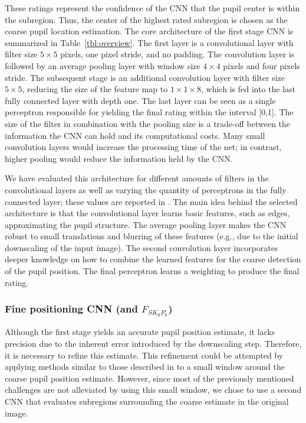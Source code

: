 These ratings represent the confidence of the CNN that the pupil center is
within the subregion. Thus, the center of the highest rated subregion is chosen
as the coarse pupil location estimation.
The core architecture of the first stage CNN is summarized in Table~\ref{tbl:overview}.
The first layer is a convolutional layer with filter size $5\times5$ pixels, one
pixel stride, and no padding.
The convolution layer is followed by an average pooling layer with window size
$4\times4$ pixels and four pixels stride. The subsequent stage is an additional
convolution layer with filter size $5\times5$, reducing the size of the feature
map to $1\times1\times8$, which is fed into the last fully connected layer with
depth one.
The last layer can be seen as a single perceptron responsible for yielding
the final rating within the interval [0,1]. The size of the filter in combination
with the pooling size is a trade-off between the information the CNN can hold
and its computational costs. Many small convolution layers would increase the
processing time of the net; in contrast, higher pooling would reduce the
information held by the CNN.


We have evaluated this architecture for different amounts of filters in the
convolutional layers as well as varying the quantity of perceptrons in the fully
connected layer; these values are reported in .
The main idea behind the selected architecture is that the convolutional layer
learns basic features, such as edges, approximating the pupil structure.
The average pooling layer makes the CNN robust to small translations and
blurring of these features (e.g., due to the initial downscaling of the input
image). The second convolution layer incorporates deeper knowledge on how to combine the
learned features for the coarse detection of the pupil position. The final
perceptron learns a weighting to produce the final rating.

\subsubsection{Fine positioning CNN (\cfin and $F_{SK_8P_8}$)}
\label{subsec:finestage}
Although the first stage yields an accurate pupil position estimate, it lacks
precision due to the inherent error introduced by the downscaling step.
Therefore, it is necessary to refine this estimate.
This refinement could be attempted by applying methods similar to those
described in  to a small window around the coarse pupil
position estimate. However, since most of the previously mentioned challenges are not alleviated by
using this small window, we chose to use a second CNN that evaluates subregions
surrounding the coarse estimate in the original image.


